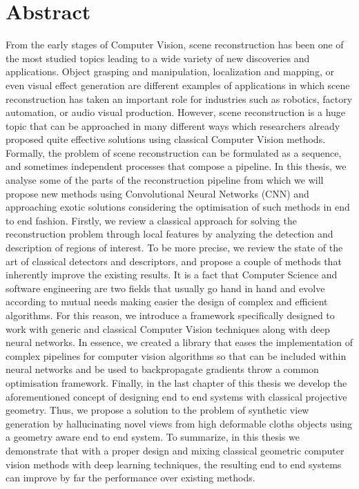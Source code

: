 


\chapter*{Abstract}

\vspace{-24mm}

From the early stages of Computer Vision, scene reconstruction has been one of the most studied topics leading to a wide variety of new discoveries and applications. Object grasping and manipulation, localization and mapping, or even visual effect generation are different examples of applications in which scene reconstruction has taken an important role for industries such as robotics, factory automation, or audio visual production. However, scene reconstruction is a huge topic that can be approached in many different ways which researchers already proposed quite effective solutions using classical Computer Vision methods. Formally, the problem of scene reconstruction can be formulated as a sequence, and sometimes independent processes that compose a pipeline. In this thesis, we analyse some of the parts of the reconstruction pipeline from which we will propose new methods using Convolutional Neural Networks (CNN) and approaching exotic solutions considering the optimisation of such methods in end to end fashion. Firstly, we review a classical approach for solving the reconstruction problem through local features by analyzing the detection and description of regions of interest. To be more precise, we review the state of the art of classical detectors and descriptors, and propose a couple of methods that inherently improve the existing results. It is a fact that Computer Science and software engineering are two fields that usually go hand in hand and evolve according to mutual needs making easier the design of complex and efficient algorithms. For this reason, we introduce a framework specifically designed to work with generic and classical Computer Vision techniques along with deep neural networks. In essence, we created a library that eases the implementation of complex pipelines for computer vision algorithms so that can be included within neural networks and be used to backpropagate gradients throw a common optimisation framework. Finally, in the last chapter of this thesis we develop the aforementioned concept of designing end to end systems with classical projective geometry. Thus, we propose a solution to the problem of synthetic view generation by hallucinating novel views from high deformable cloths objects using a geometry aware end to end system. To summarize, in this thesis we demonstrate that with a proper design and mixing classical geometric computer vision methods with deep learning techniques, the resulting end to end systems can improve by far the performance over existing methods.

